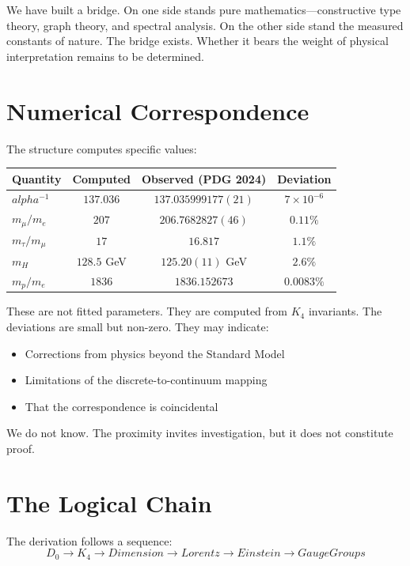 \documentclass[11pt,a4paper]{book}
\def\alpha{alpha}%
\def\text#1{#1}%
\begin{document}
We have built a bridge. On one side stands pure mathematics---constructive type theory, graph theory, and spectral analysis. On the other side stand the measured constants of nature. The bridge exists. Whether it bears the weight of physical interpretation remains to be determined.

\section{Numerical Correspondence}

The structure computes specific values:

\begin{center}
\begin{tabular}{lccc}
\hline
\textbf{Quantity} & \textbf{Computed} & \textbf{Observed (PDG 2024)} & \textbf{Deviation} \\
\hline
$\alpha^{-1}$ & $137.036$ & $137.035999177(21)$ & $7 \times 10^{-6}$ \\
$m_\mu / m_e$ & $207$ & $206.7682827(46)$ & $0.11\%$ \\
$m_\tau / m_\mu$ & $17$ & $16.817$ & $1.1\%$ \\
$m_H$ & $128.5$ GeV & $125.20(11)$ GeV & $2.6\%$ \\
$m_p / m_e$ & $1836$ & $1836.152673$ & $0.0083\%$ \\
\hline
\end{tabular}
\end{center}

These are not fitted parameters. They are computed from $K_4$ invariants. The deviations are small but non-zero. They may indicate:
\begin{itemize}
\item Corrections from physics beyond the Standard Model
\item Limitations of the discrete-to-continuum mapping
\item That the correspondence is coincidental
\end{itemize}

We do not know. The proximity invites investigation, but it does not constitute proof.

\section{The Logical Chain}

The derivation follows a sequence:
\[
D_0 \to K_4 \to \text{Dimension} \to \text{Lorentz} \to \text{Einstein} \to \text{Gauge Groups}
\]
\end{document}
